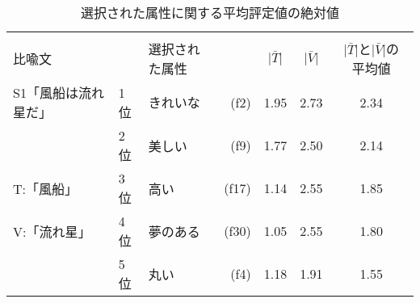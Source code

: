 \begin{table}[tb] 
\caption{選択された属性に関する平均評定値の絶対値}
\label{tbl:hyo7}
\begin{center}
\begin{small}
\begin{tabular}{|l|llr|c|c|c|}
  \hline
    & & & & & & \\
   比喩文   & & 選択された属性 &  & \(\vert\bar{T}\vert\) &
\(\vert\bar{V}\vert\)  &\(\vert\bar{T}\vert\)と\(\vert\bar{V}\vert\)の
平均値   \\
  \hline
 S1「風船は流れ星だ」 & 1位 & きれいな  & (f2) & 1.95 & 2.73 & 2.34  \\
           & 2位 & 美しい  & (f9) & 1.77 & 2.50 & 2.14    \\
    \hspace{0.8cm}T:\hspace{0.1cm}「風船」                & 3位 &
高い      & (f17) & 1.14 & 2.55 & 1.85  \\
    \hspace{0.8cm}V:\hspace{0.1cm}「流れ星」                & 4位 & 夢のある & 
 (f30) & 1.05 & 2.55 & 1.80 \\
                    & 5位 & 丸い  & (f4)  & 1.18
 & 1.91 & 1.55   \\ \hline
\end{tabular}
\end{small}
\end{center}
\end{table}


